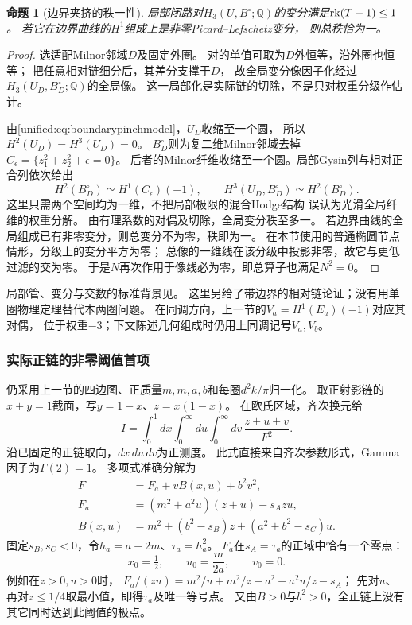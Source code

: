 \documentclass[11pt,a4paper,oneside]{ctexart}
\theoremstyle{cnplain}
\newtheorem{proposition}[theorem]{命题}
\theoremstyle{definition}
\theoremstyle{remark}
\newcommand{\Q}{\mathbb Q}
\numberwithin{equation}{section}
\begin{document}
\begin{proposition}[边界夹挤的秩一性]\label{unified:prop:boundaryrankone}
局部闭路对$H_3(U,B^\circ;\Q)$的变分满足$\operatorname{rk}(T-1)\leq1$。
若它在边界曲线的$H^1$组成上是非零Picard--Lefschetz变分，
则总秩恰为一。
\end{proposition}
\begin{proof}
选适配Milnor邻域$D$及固定外圈。
对的单值可取为$D$外恒等，沿外圈也恒等；
把任意相对链细分后，其差分支撑于$D$，
故全局变分像因子化经过
$H_3(U_D,B_D^\circ;\Q)$的全局像。
这一局部化是实际链的切除，不是只对权重分级作估计。

由\eqref{unified:eq:boundarypinchmodel}，$U_D$收缩至一个圆，
所以$H^2(U_D)=H^3(U_D)=0$。
$B_D^\circ$则为复二维Milnor邻域去掉
$C_\epsilon=\{z_1^2+z_2^2+\epsilon=0\}$。
后者的Milnor纤维收缩至一个圆。局部Gysin列与相对正合列依次给出
\[
 H^2(B_D^\circ)\simeq H^1(C_\epsilon)(-1),\qquad
 H^3(U_D,B_D^\circ)\simeq H^2(B_D^\circ).
\]
这里只需两个空间均为一维，不把局部极限的混合Hodge结构
误认为光滑全局纤维的权重分解。
由有理系数的对偶及切除，全局变分秩至多一。
若边界曲线的全局组成已有非零变分，则总变分不为零，秩即为一。
在本节使用的普通椭圆节点情形，分级上的变分平方为零；
总像的一维线在该分级中投影非零，故它与更低过滤的交为零。
于是$N$再次作用于像线必为零，即总算子也满足$N^2=0$。
\end{proof}

局部管、变分与交数的标准背景见\cite[\S2.3]{muhlbauer}。
这里另给了带边界的相对链论证；没有用单圈物理定理替代本两圈问题。
在同调方向，上一节的$V_a=H^1(E_a)(-1)$对应其对偶，
位于权重$-3$；下文陈述几何组成时仍用上同调记号$V_a,V_b$。

\subsubsection{实际正链的非零阈值首项}
仍采用上一节的四边图、正质量$m,m,a,b$和每圈$d^2k/\pi$归一化。
取正射影链的$x+y=1$截面，写$y=1-x$、$z=x(1-x)$。
在欧氏区域，齐次换元给
\begin{equation}\label{unified:eq:scalaricechart}
 I=\int_0^1dx\int_0^\infty du\int_0^\infty dv\,
       \frac{z+u+v}{F^2}.
\end{equation}
沿已固定的正链取向，$dx\,du\,dv$为正测度。
此式直接来自齐次参数形式，Gamma因子为$\Gamma(2)=1$。
多项式准确分解为
\begin{align}
 F&=F_a+vB(x,u)+b^2v^2,\label{unified:eq:scalariceexpand}\\
 F_a&=(m^2+a^2u)(z+u)-s_Azu,\nonumber\\
 B(x,u)&=m^2+(b^2-s_B)z+(a^2+b^2-s_C)u.\nonumber
\end{align}
固定$s_B,s_C<0$，令$h_a=a+2m$、$\tau_a=h_a^2$。
$F_a$在$s_A=\tau_a$的正域中恰有一个零点：
\[
 x_0=\tfrac12,\qquad u_0=\frac{m}{2a},\qquad v_0=0.
\]
例如在$z>0,u>0$时，
$F_a/(zu)=m^2/u+m^2/z+a^2+a^2u/z-s_A$；
先对$u$、再对$z\leq1/4$取最小值，即得$\tau_a$及唯一等号点。
又由$B>0$与$b^2>0$，全正链上没有其它同时达到此阈值的极点。
\end{document}
